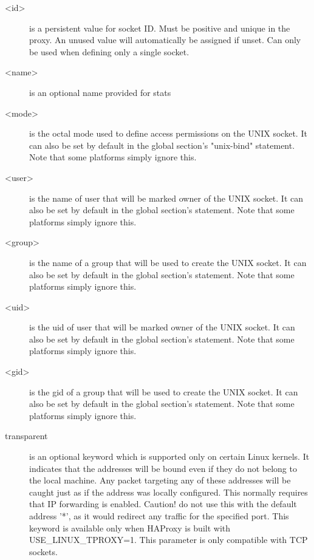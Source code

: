 \begin{description}
  \item[<id>]
                  is a persistent value for socket ID. Must be positive and
                  unique in the proxy. An unused value will automatically be
                  assigned if unset. Can only be used when defining only a
                  single socket.

  \item[<name>]
                  is an optional name provided for stats

  \item[<mode>]   is the octal mode used to define access permissions on the
                  UNIX socket. It can also be set by default in the global
                  section's "unix-bind" statement. Note that some platforms
                  simply ignore this.

  \item[<user>]
                  is the name of user that will be marked owner of the UNIX
                  socket.  It can also be set by default in the global
                  section's  statement. Note that some platforms
                  simply ignore this.

  \item[<group>]
                  is the name of a group that will be used to create the UNIX
                  socket. It can also be set by default in the global section's
                   statement. Note that some platforms simply ignore
                  this.

  \item[<uid>]
                  is the uid of user that will be marked owner of the UNIX
                  socket. It can also be set by default in the global section's
                   statement. Note that some platforms simply ignore
                  this.

  \item[<gid>]
                  is the gid of a group that will be used to create the UNIX
                  socket. It can also be set by default in the global section's
                   statement. Note that some platforms simply ignore
                  this.

  \item[transparent]
                  is an optional keyword which is supported only on certain
                  Linux kernels. It indicates that the addresses will be bound
                  even if they do not belong to the local machine. Any packet
                  targeting any of these addresses will be caught just as if
                  the address was locally configured. This normally requires
                  that IP forwarding is enabled. Caution! do not use this with
                  the default address '*', as it would redirect any traffic for
                  the specified port. This keyword is available only when
                  HAProxy is built with USE\_LINUX\_TPROXY=1. This parameter is
                  only compatible with TCP sockets.


\end{description}
